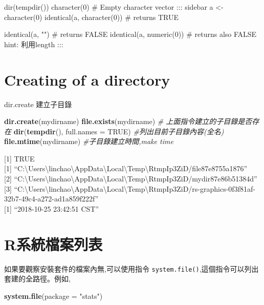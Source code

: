 \documentclass[]{book}
\newenvironment{Shaded}{\begin{snugshade}}{\end{snugshade}}
\newcommand{\CommentTok}[1]{\textcolor[rgb]{0.56,0.35,0.01}{\textit{#1}}}
\newcommand{\DataTypeTok}[1]{\textcolor[rgb]{0.13,0.29,0.53}{#1}}
\newcommand{\KeywordTok}[1]{\textcolor[rgb]{0.13,0.29,0.53}{\textbf{#1}}}
\newcommand{\NormalTok}[1]{#1}
\newcommand{\OtherTok}[1]{\textcolor[rgb]{0.56,0.35,0.01}{#1}}
\newcommand{\StringTok}[1]{\textcolor[rgb]{0.31,0.60,0.02}{#1}}
\theoremstyle{definition}
\theoremstyle{definition}
\theoremstyle{definition}
\theoremstyle{remark}
\begin{document}
dir(tempdir()) character(0) \# Empty character vector ::: sidebar a
\textless{}- character(0) identical(a, character(0)) \# returns TRUE

identical(a, "") \# returns FALSE identical(a, numeric(0)) \# returns
also FALSE hint: 利用length :::

\hypertarget{creating-of-a-directory}{%
\section{Creating of a directory}\label{creating-of-a-directory}}

dir.create 建立子目錄

\begin{Shaded}
\begin{Highlighting}[]
\KeywordTok{dir.create}\NormalTok{(mydirname)  }
\KeywordTok{file.exists}\NormalTok{(mydirname) }\CommentTok{# 上面指令建立的子目錄是否存在}
\KeywordTok{dir}\NormalTok{(}\KeywordTok{tempdir}\NormalTok{(), }\DataTypeTok{full.names =} \OtherTok{TRUE}\NormalTok{) }\CommentTok{#列出目前子目錄內容(全名)}
\KeywordTok{file.mtime}\NormalTok{(mydirname) }\CommentTok{#子目錄建立時間,make time}
\end{Highlighting}
\end{Shaded}

{[}1{]} TRUE\\
{[}1{]}
``C:\textbackslash{}Users\textbackslash{}linchao\textbackslash{}AppData\textbackslash{}Local\textbackslash{}Temp\textbackslash{}RtmpIp3ZiD/file87e8755a1876''\\
{[}2{]}
``C:\textbackslash{}Users\textbackslash{}linchao\textbackslash{}AppData\textbackslash{}Local\textbackslash{}Temp\textbackslash{}RtmpIp3ZiD/mydir87e86b51384d''\\
{[}3{]}
``C:\textbackslash{}Users\textbackslash{}linchao\textbackslash{}AppData\textbackslash{}Local\textbackslash{}Temp\textbackslash{}RtmpIp3ZiD/rs-graphics-0f3f81af-32b7-49c4-a272-ad1a859f222f''\\
{[}1{]} ``2018-10-25 23:42:51 CST''

\hypertarget{r}{%
\section{R系統檔案列表}\label{r}}

如果要觀察安裝套件的檔案內無,可以使用指令
\texttt{system.file()},這個指令可以列出套建的全路徑。例如,

\begin{Shaded}
\begin{Highlighting}[]
\KeywordTok{system.file}\NormalTok{(}\DataTypeTok{package =} \StringTok{"stats"}\NormalTok{)}
\end{Highlighting}
\end{Shaded}
\end{document}
